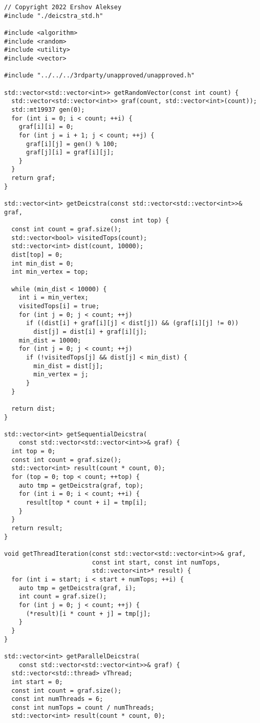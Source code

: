 \documentclass{report}
\begin{document}
\begin{lstlisting}
// Copyright 2022 Ershov Aleksey
#include "./deicstra_std.h"

#include <algorithm>
#include <random>
#include <utility>
#include <vector>

#include "../../../3rdparty/unapproved/unapproved.h"

std::vector<std::vector<int>> getRandomVector(const int count) {
  std::vector<std::vector<int>> graf(count, std::vector<int>(count));
  std::mt19937 gen(0);
  for (int i = 0; i < count; ++i) {
    graf[i][i] = 0;
    for (int j = i + 1; j < count; ++j) {
      graf[i][j] = gen() % 100;
      graf[j][i] = graf[i][j];
    }
  }
  return graf;
}

std::vector<int> getDeicstra(const std::vector<std::vector<int>>& graf,
                             const int top) {
  const int count = graf.size();
  std::vector<bool> visitedTops(count);
  std::vector<int> dist(count, 10000);
  dist[top] = 0;
  int min_dist = 0;
  int min_vertex = top;

  while (min_dist < 10000) {
    int i = min_vertex;
    visitedTops[i] = true;
    for (int j = 0; j < count; ++j)
      if ((dist[i] + graf[i][j] < dist[j]) && (graf[i][j] != 0))
        dist[j] = dist[i] + graf[i][j];
    min_dist = 10000;
    for (int j = 0; j < count; ++j)
      if (!visitedTops[j] && dist[j] < min_dist) {
        min_dist = dist[j];
        min_vertex = j;
      }
  }

  return dist;
}

std::vector<int> getSequentialDeicstra(
    const std::vector<std::vector<int>>& graf) {
  int top = 0;
  const int count = graf.size();
  std::vector<int> result(count * count, 0);
  for (top = 0; top < count; ++top) {
    auto tmp = getDeicstra(graf, top);
    for (int i = 0; i < count; ++i) {
      result[top * count + i] = tmp[i];
    }
  }
  return result;
}

void getThreadIteration(const std::vector<std::vector<int>>& graf,
                        const int start, const int numTops,
                        std::vector<int>* result) {
  for (int i = start; i < start + numTops; ++i) {
    auto tmp = getDeicstra(graf, i);
    int count = graf.size();
    for (int j = 0; j < count; ++j) {
      (*result)[i * count + j] = tmp[j];
    }
  }
}

std::vector<int> getParallelDeicstra(
    const std::vector<std::vector<int>>& graf) {
  std::vector<std::thread> vThread;
  int start = 0;
  const int count = graf.size();
  const int numThreads = 6;
  const int numTops = count / numThreads;
  std::vector<int> result(count * count, 0);


\end{lstlisting}
\end{document}
